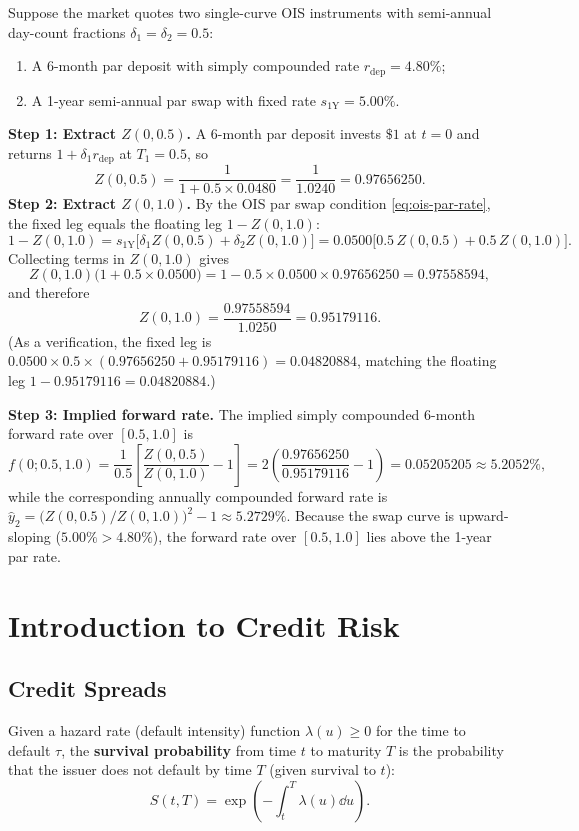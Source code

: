 \begin{example}\label{ex:bootstrapping}
    Suppose the market quotes two single-curve OIS instruments with semi-annual day-count fractions $\delta_1 = \delta_2 = 0.5$:
    \begin{enumerate}
        \item A 6-month par deposit with simply compounded rate $r_{\mathrm{dep}} = 4.80\%$;
        \item A 1-year semi-annual par swap with fixed rate $s_{1\mathrm{Y}} = 5.00\%$.
    \end{enumerate}
    \textbf{Step 1: Extract $Z(0, 0.5)$.} A 6-month par deposit invests $\$1$ at $t = 0$ and returns $1 + \delta_1 r_{\mathrm{dep}}$ at $T_1 = 0.5$, so
    \[
    Z(0, 0.5) = \frac{1}{1 + 0.5 \times 0.0480} = \frac{1}{1.0240} = 0.97656250.
    \]
    \textbf{Step 2: Extract $Z(0, 1.0)$.} By the OIS par swap condition \eqref{eq:ois-par-rate}, the fixed leg equals the floating leg $1 - Z(0, 1.0)$:
    \[
    1 - Z(0, 1.0) = s_{1\mathrm{Y}}\bigl[\delta_1 Z(0, 0.5) + \delta_2 Z(0, 1.0)\bigr] = 0.0500\bigl[0.5\,Z(0, 0.5) + 0.5\,Z(0, 1.0)\bigr].
    \]
    Collecting terms in $Z(0, 1.0)$ gives
    \[
    Z(0, 1.0)\bigl(1 + 0.5 \times 0.0500\bigr) = 1 - 0.5 \times 0.0500 \times 0.97656250 = 0.97558594,
    \]
    and therefore
    \[
    Z(0, 1.0) = \frac{0.97558594}{1.0250} = 0.95179116.
    \]
    (As a verification, the fixed leg is $0.0500 \times 0.5 \times (0.97656250 + 0.95179116) = 0.04820884$, matching the floating leg $1 - 0.95179116 = 0.04820884$.)

    \textbf{Step 3: Implied forward rate.} The implied simply compounded 6-month forward rate over $[0.5, 1.0]$ is
    \[
    f(0; 0.5, 1.0) = \frac{1}{0.5}\left[\frac{Z(0, 0.5)}{Z(0, 1.0)} - 1\right] = 2\left(\frac{0.97656250}{0.95179116} - 1\right) = 0.05205205 \approx 5.2052\%,
    \]
    while the corresponding annually compounded forward rate is $\hat{y}_2 = \bigl(Z(0, 0.5)/Z(0, 1.0)\bigr)^{2} - 1 \approx 5.2729\%$. Because the swap curve is upward-sloping ($5.00\% > 4.80\%$), the forward rate over $[0.5, 1.0]$ lies above the 1-year par rate.
\end{example}

\section{Introduction to Credit Risk}

\subsection*{Credit Spreads}
\begin{definition}\label{def:survival-prob}
    Given a hazard rate (default intensity) function $\lambda(u) \geq 0$ for the time to default $\tau$, the \textbf{survival probability} from time $t$ to maturity $T$ is the probability that the issuer does not default by time $T$ (given survival to $t$):
    \[
    S(t, T) = \exp\!\left(-\int_t^T \lambda(u)\dd u\right).
    \]
\end{definition}

